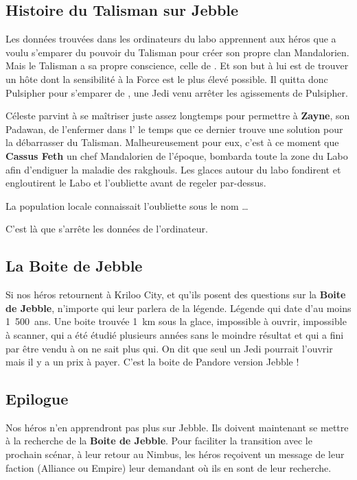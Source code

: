 \subsection{Histoire du Talisman sur Jebble}\label{sec:talisman-jebble}
Les données trouvées dans les ordinateurs du labo apprennent aux héros que  a voulu s’emparer du pouvoir du Talisman pour créer son propre clan Mandalorien. Mais le Talisman a sa propre conscience, celle de . Et son but à lui est de trouver un hôte dont la sensibilité à la Force est le plus élevé possible. Il quitta donc Pulsipher pour s’emparer de , une Jedi venu arrêter les agissements de Pulsipher.

Céleste parvint à se maîtriser juste assez longtemps pour permettre à \textbf{Zayne}, son Padawan, de l’enfermer dans l’ le temps que ce dernier trouve une solution pour la débarrasser du Talisman. Malheureusement pour eux, c’est à ce moment que \textbf{Cassus Feth} un chef Mandalorien de l’époque, bombarda toute la zone du Labo afin d’endiguer la maladie des rakghouls. Les glaces autour du labo fondirent et engloutirent le Labo et l’oubliette avant de regeler par-dessus.

La population locale connaissait l’oubliette sous le nom \ldots 

C’est là que s’arrête les données de l’ordinateur.

\subsection{La Boite de Jebble}
Si nos héros retournent à Kriloo City, et qu’ils posent des questions sur la \textbf{Boite de Jebble}, n’importe qui leur parlera de la légende. Légende qui date d’au moins 1~500~ans. Une boite trouvée 1~km sous la glace, impossible à ouvrir, impossible à scanner, qui a été étudié plusieurs années sans le moindre résultat et qui a fini par être vendu à on ne sait plus qui. On dit que seul un Jedi pourrait l’ouvrir mais il y a un prix à payer. C’est la boite de Pandore version Jebble !

\subsection{\’Epilogue}
Nos héros n’en apprendront pas plus sur Jebble. Ils doivent maintenant se mettre à la recherche de la \textbf{Boite de Jebble}. Pour faciliter la transition avec le prochain scénar, à leur retour au Nimbus, les héros reçoivent un message de leur faction (Alliance ou Empire) leur demandant où ils en sont de leur recherche.

